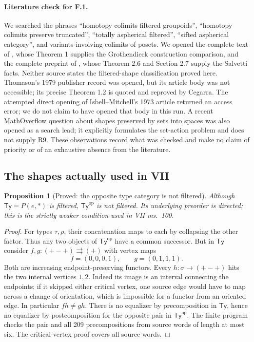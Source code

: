 \documentclass[11pt,a4paper]{article}
\newtheorem{proposition}[theorem]{Proposition}
\theoremstyle{definition}
\theoremstyle{remark}
\begin{document}
\paragraph{Literature check for F.1.}
We searched the phrases ``homotopy colimits filtered groupoids'',
``homotopy colimits preserve truncated'', ``totally aspherical
filtered'', ``sifted aspherical category'', and variants involving
colimits of posets.  We opened the complete text of
\citet{Cegarra2020}, whose Theorem 1 supplies the Grothendieck
construction comparison, and the complete preprint of
\citet{Charney2007}, whose Theorem 2.6 and Section 2.7 supply the
Salvetti facts.  Neither source states the filtered-shape
classification proved here.  Thomason's 1979 publisher record was
opened, but its article body was not accessible; its precise
Theorem 1.2 is quoted and reproved by Cegarra.  The attempted direct
opening of Isbell--Mitchell's 1973 article returned an access error;
we do not claim to have opened that body in this run.  A recent
MathOverflow question about shapes preserved by sets into spaces
was also opened as a search lead; it explicitly formulates the
set-action problem and does not supply R9.  These observations
record what was checked and make no claim of priority or of an
exhaustive absence from the literature.

\subsection{The shapes actually used in VII}\label{sec:vii-shapes}

\begin{proposition}[Proved: the opposite type category is not filtered]
\label{F4:opposite-types}
Although $\mathsf{Ty}=P(e,*)$ is filtered,
$\mathsf{Ty}^{\mathrm{op}}$ is not filtered.  Its underlying preorder
is directed; this is the strictly weaker condition used in
VII ms.~100.
\end{proposition}
\begin{proof}
For types $\tau,\rho$, their concatenation maps to each by collapsing
the other factor.  Thus any two objects of
$\mathsf{Ty}^{\mathrm{op}}$ have a common successor.  But in
$\mathsf{Ty}$ consider $f,g:(+-+)\rightrightarrows(+)$ with vertex
maps
\[
f=(0,0,0,1),\qquad g=(0,1,1,1).
\]
Both are increasing endpoint-preserving functors.  Every
$h:\sigma\to(+-+)$ hits the two internal vertices $1,2$.
Indeed its image is an interval connecting the endpoints; if it skipped
either critical vertex, one source edge would have to map across a
change of orientation, which is impossible for a functor from an
oriented edge.  In particular $fh\ne gh$.  There is no equalizer by
precomposition in $\mathsf{Ty}$, hence no equalizer by postcomposition
for the opposite pair in $\mathsf{Ty}^{\mathrm{op}}$.
The finite program checks the pair and all 209 precompositions from
source words of length at most six.  The critical-vertex proof covers
all source words.
\end{proof}
\end{document}
